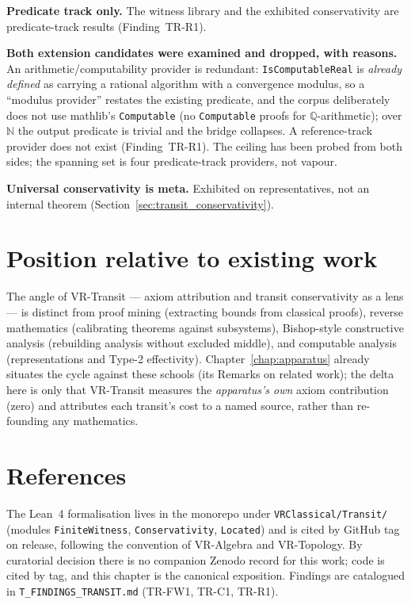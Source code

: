 \textbf{Predicate track only.}  The witness library and the exhibited
conservativity are predicate-track results (Finding~TR-R1).

\textbf{Both extension candidates were examined and dropped, with reasons.}  An
arithmetic/computability provider is redundant: \texttt{IsComputableReal} is
\emph{already defined} as carrying a rational algorithm with a convergence modulus,
so a ``modulus provider'' restates the existing predicate, and the corpus
deliberately does not use mathlib's \texttt{Computable} (no \texttt{Computable} proofs
for $\mathbb{Q}$-arithmetic); over $\mathbb{N}$ the output predicate is trivial and
the bridge collapses.  A reference-track provider does not exist (Finding~TR-R1).
The ceiling has been probed from both sides; the spanning set is four predicate-track
providers, not vapour.

\textbf{Universal conservativity is meta.}  Exhibited on representatives, not an
internal theorem (Section~\ref{sec:transit_conservativity}).

\section{Position relative to existing work}
\label{sec:transit_related}

The angle of VR-Transit --- axiom attribution and transit conservativity as a lens
--- is distinct from proof mining (extracting bounds from classical proofs), reverse
mathematics (calibrating theorems against subsystems), Bishop-style constructive
analysis (rebuilding analysis without excluded middle), and computable analysis
(representations and Type-2 effectivity).  Chapter~\ref{chap:apparatus} already
situates the cycle against these schools (its Remarks on related work); the delta
here is only that VR-Transit measures the \emph{apparatus's own} axiom contribution
(zero) and attributes each transit's cost to a named source, rather than re-founding
any mathematics.

\section{References}
\label{sec:transit_refs}

The Lean~4 formalisation lives in the monorepo under \texttt{VRClassical/Transit/}
(modules \texttt{FiniteWitness}, \texttt{Conservativity}, \texttt{Located}) and is
cited by GitHub tag on release, following the convention of VR-Algebra and
VR-Topology.  By curatorial decision there is no companion Zenodo record for this
work; code is cited by tag, and this chapter is the canonical exposition.  Findings
are catalogued in \texttt{T\_FINDINGS\_TRANSIT.md} (TR-FW1, TR-C1, TR-R1).
